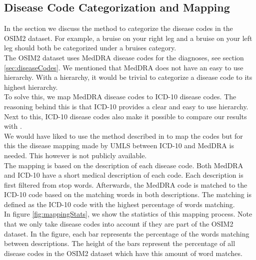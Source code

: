 \subsection{Disease Code Categorization and Mapping}
\label{sec:mapping}

In the section we discuss the method to categorize the disease codes in the OSIM2 dataset.  For example, a bruise on your right leg and a bruise on your left leg should both be categorized under a bruises category. \\

The OSIM2 dataset uses MedDRA disease codes for the diagnoses, see section \ref{sec:diseaseCodes}. We mentioned that MedDRA does not have an easy to use hierarchy. With a hierarchy, it would be trivial to categorize a disease code to its highest hierarchy. \\
To solve this, we map MedDRA disease codes to ICD-10 disease codes. The reasoning behind this is that ICD-10 provides a clear and easy to use hierarchy. Next to this, ICD-10 disease codes also make it possible to compare our results with \cite{Brunak:article}. \\
We would have liked to use the method described in \cite{icd10Mapping:article} to map the codes but for this the disease mapping made by UMLS between ICD-10 and MedDRA is needed. This however is not publicly available. \\

The mapping is based on the description of each disease code. Both MedDRA and ICD-10 have a short medical description of each code. Each description is first filtered from stop words. Afterwards, the MedDRA code is matched to the ICD-10 code based on the matching words in both descriptions. The matching is defined as the ICD-10 code with the highest percentage of words matching. \\

In figure \ref{fig:mappingStats}, we show the statistics of this mapping process. Note that we only take disease codes into account if they are part of the OSIM2 dataset. In the figure, each bar represents the percentage of the words matching between descriptions. The height of the bars represent the percentage of all disease codes in the OSIM2 dataset which have this amount of word matches. \\

